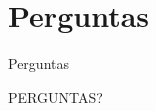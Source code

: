 \documentclass{beamer}
\begin{document}
\section{Perguntas}

\begin{frame}{Perguntas}
	\begin{center}		
		\Huge PERGUNTAS?
	\end{center}
	
\end{frame}
\end{document}
